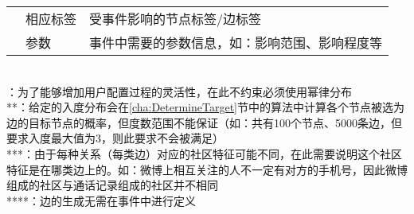 \begin{table}[htb]
\begin{minipage}[t]{1\textwidth}
\begin{tabularx}{\linewidth}{llX}
       & 相应标签 & 受事件影响的节点标签/边标签 \\\cline{2-3}
       & 参数 & 事件中需要的参数信息，如：影响范围、影响程度等\\
      \bottomrule[1.5pt]
    \end{tabularx}\\[2pt]
    \footnotesize *：为了能够增加用户配置过程的灵活性，在此不约束必须使用幂律分布\\ **：给定的入度分布会在\ref{cha:DetermineTarget}节中的算法中计算各个节点被选为边的目标节点的概率，但度数范围不能保证（如：共有100个节点、5000条边，但要求入度最大值为3，则此要求不会被满足）\\ ***：由于每种关系（每类边）对应的社区特征可能不同，在此需要说明这个社区特征是在哪类边上的。如：微博上相互关注的人不一定有对方的手机号，因此微博组成的社区与通话记录组成的社区并不相同\\ ****：边的生成无需在事件中进行定义
  \end{minipage}
\end{table}